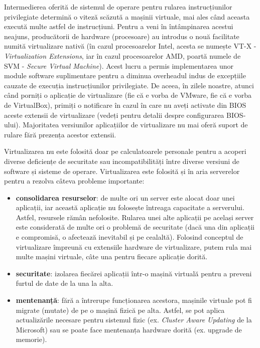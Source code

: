 Intermedierea oferită de sistemul de operare pentru rularea instrucțiunilor privilegiate determină o viteză scăzută a mașinii virtuale, mai ales când aceasta execută multe astfel de instrucțiuni.
Pentru a veni în întâmpinarea acestui neajuns, producătorii de hardware (procesoare) au introdus o nouă facilitate numită virtualizare nativă (în cazul procesoarelor Intel, acesta se numește VT-X - \textit{Virtualization Extensions}, iar în cazul procesoarelor AMD, poartă numele de SVM - \textit{Secure Virtual Machine}).
Acest lucru a permis implementarea unor module software suplimentare pentru a diminua overheadul indus de excepțiile cauzate de execuția instrucțiunilor privilegiate.
De aceea, în zilele noastre, atunci când porniți o aplicație de virtualizare (fie că e vorba de VMware, fie că e vorba de VirtualBox), primiți o notificare în cazul în care nu aveți activate din BIOS aceste extensii de virtualizare (vedeți  pentru detalii despre configurarea BIOS-ului).
Majoritatea versiunilor aplicațiilor de virtualizare nu mai oferă suport de rulare fără prezența acestor extensii.

Virtualizarea nu este folosită doar pe calculatoarele personale pentru a acoperi diverse deficiențe de securitate sau incompatibilități între diverse versiuni de software și sisteme de operare.
Virtualizarea este folosită și în aria serverelor pentru a rezolva câteva probleme importante:

\begin{itemize}
  \item \textbf{consolidarea resurselor}: de multe ori un server este alocat doar unei aplicații, iar această aplicație nu folosește întreaga capacitate a serverului.
    Astfel, resursele rămân nefolosite.
    Rularea unei alte aplicații pe același server este considerată de multe ori o problemă de securitate (dacă una din aplicații e compromisă, o afectează inevitabil și pe cealaltă).
    Folosind conceptul de virtualizare împreună cu extensiile hardware de virtualizare, putem rula mai multe mașini virtuale, câte una pentru fiecare aplicație dorită.
  \item \textbf{securitate}: izolarea fiecărei aplicații într-o mașină virtuală pentru a preveni furtul de date de la una la alta.
  \item \textbf{mentenanță}: fără a întrerupe funcționarea acestora, mașinile virtuale pot fi migrate (mutate) de pe o mașină fizică pe alta.
    Astfel, se pot aplica actualizările necesare pentru sistemul fizic (ex. \textit{Cluster Aware Updating} de la Microsoft) sau se poate face mentenanța hardware dorită (ex. upgrade de memorie).
\end{itemize}

